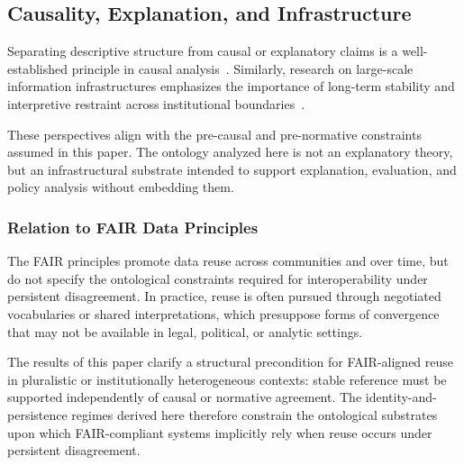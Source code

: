 \subsection{Causality, Explanation, and Infrastructure}

Separating descriptive structure from causal or explanatory claims is a
well-established principle in causal analysis~\citep{pearl2009causality}.
Similarly, research on large-scale information infrastructures emphasizes
the importance of long-term stability and interpretive restraint across
institutional boundaries~\citep{edwards2011infrastructure}.

These perspectives align with the pre-causal and pre-normative constraints assumed in this paper.
The ontology analyzed here is not an explanatory theory, but an
infrastructural substrate intended to support explanation, evaluation, and
policy analysis without embedding them.

\subsubsection{Relation to FAIR Data Principles}

The FAIR principles promote data reuse across communities and over time,
but do not specify the ontological constraints required for interoperability
under persistent disagreement.
In practice, reuse is often pursued through
negotiated vocabularies or shared interpretations,
which presuppose forms of convergence that may not be
available in legal, political, or analytic settings.

The results of this paper clarify a structural precondition for FAIR-aligned
reuse in pluralistic or institutionally heterogeneous contexts:
stable reference must be supported independently of
causal or normative agreement.
The identity-and-persistence regimes derived here therefore constrain the
ontological substrates upon which FAIR-compliant systems implicitly rely
when reuse occurs under persistent disagreement.
